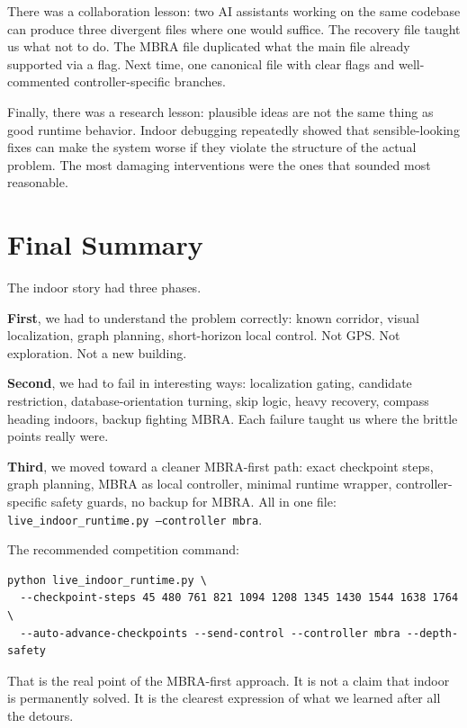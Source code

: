 \documentclass[11pt]{article}
\begin{document}
There was a collaboration lesson: two AI assistants working on the same codebase can produce three divergent files where one would suffice. The recovery file taught us what not to do. The MBRA file duplicated what the main file already supported via a flag. Next time, one canonical file with clear flags and well-commented controller-specific branches.

Finally, there was a research lesson: plausible ideas are not the same thing as good runtime behavior. Indoor debugging repeatedly showed that sensible-looking fixes can make the system worse if they violate the structure of the actual problem. The most damaging interventions were the ones that sounded most reasonable.


\section{Final Summary}

The indoor story had three phases.

\textbf{First}, we had to understand the problem correctly: known corridor, visual localization, graph planning, short-horizon local control. Not GPS. Not exploration. Not a new building.

\textbf{Second}, we had to fail in interesting ways: localization gating, candidate restriction, database-orientation turning, skip logic, heavy recovery, compass heading indoors, backup fighting MBRA. Each failure taught us where the brittle points really were.

\textbf{Third}, we moved toward a cleaner MBRA-first path: exact checkpoint steps, graph planning, MBRA as local controller, minimal runtime wrapper, controller-specific safety guards, no backup for MBRA. All in one file: \texttt{live\_indoor\_runtime.py --controller mbra}.

The recommended competition command:
\begin{lstlisting}
python live_indoor_runtime.py \
  --checkpoint-steps 45 480 761 821 1094 1208 1345 1430 1544 1638 1764 \
  --auto-advance-checkpoints --send-control --controller mbra --depth-safety
\end{lstlisting}

That is the real point of the MBRA-first approach. It is not a claim that indoor is permanently solved. It is the clearest expression of what we learned after all the detours.
\end{document}
